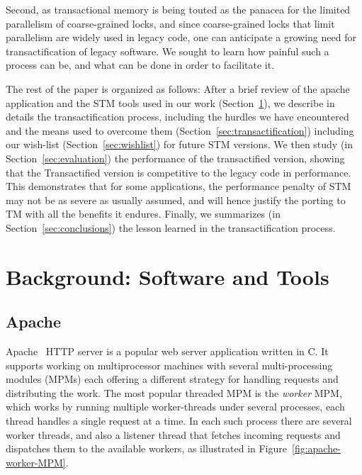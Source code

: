 \documentclass[preprint,11pt]{sigplanconf}
\let \cite = \citep
\begin{document}
Second, as transactional memory is being touted as the panacea for the limited parallelism 
of coarse-grained locks, and since coarse-grained locks that limit parallelism are widely used 
in legacy code, one can anticipate a growing need for transactification of legacy software. 
We sought to learn how painful such a process can be, and what can be done in order to 
facilitate it.

The rest of the paper is organized as follows: After a brief review of the
apache application and the STM tools used in our work
(Section~\ref{sec:background}), we describe in details the transactification
process, including the hurdles we have encountered and the means used to
overcome them (Section~\ref{sec:transactification}) including our wish-list
(Section~\ref{sec:wishlist}) for future STM versions. We then study (in
Section~\ref{sec:evaluation}) the performance of the transactified version,
showing that the Transactified version is competitive to the legacy code in
performance. This demonstrates that for some applications, the performance
penalty of STM may not be as severe as usually assumed, and will hence justify
the porting to TM with all the benefits it endures. Finally, we summarizes (in
Section~\ref{sec:conclusions}) the lesson learned in the transactification
process.

\section{Background: Software and Tools}\label{sec:background}
\subsection{Apache}\label{sec:apache}
Apache~\cite{apache} HTTP server is a popular web server application written in
C. It supports working on multiprocessor machines with several multi-processing
modules (MPMs) each offering a different strategy for handling requests and
distributing the work. The most popular threaded MPM is the \emph{worker} MPM,
which works by running multiple worker-threads under several processes, each
thread handles a single request at a time. In each such process there are
several worker threads, and also a listener thread that fetches incoming
requests and dispatches them to the available workers, as illustrated in
Figure~\ref{fig:apache-worker-MPM}.
\end{document}
